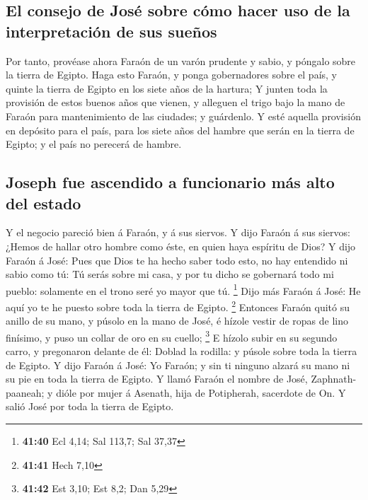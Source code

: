 \hypertarget{el-consejo-de-josuxe9-sobre-cuxf3mo-hacer-uso-de-la-interpretaciuxf3n-de-sus-sueuxf1os}{%
\subsection{El consejo de José sobre cómo hacer uso de la interpretación
de sus
sueños}\label{el-consejo-de-josuxe9-sobre-cuxf3mo-hacer-uso-de-la-interpretaciuxf3n-de-sus-sueuxf1os}}

 Por tanto, provéase ahora Faraón de un varón prudente y
sabio, y póngalo sobre la tierra de Egipto.  Haga esto
Faraón, y ponga gobernadores sobre el país, y quinte la tierra de Egipto
en los siete años de la hartura;  Y junten toda la
provisión de estos buenos años que vienen, y alleguen el trigo bajo la
mano de Faraón para mantenimiento de las ciudades; y guárdenlo.
 Y esté aquella provisión en depósito para el país, para
los siete años del hambre que serán en la tierra de Egipto; y el país no
perecerá de hambre.

\hypertarget{joseph-fue-ascendido-a-funcionario-muxe1s-alto-del-estado}{%
\subsection{Joseph fue ascendido a funcionario más alto del
estado}\label{joseph-fue-ascendido-a-funcionario-muxe1s-alto-del-estado}}

 Y el negocio pareció bien á Faraón, y á sus siervos.
 Y dijo Faraón á sus siervos: ¿Hemos de hallar otro
hombre como éste, en quien haya espíritu de Dios?  Y dijo
Faraón á José: Pues que Dios te ha hecho saber todo esto, no hay
entendido ni sabio como tú:  Tú serás sobre mi casa, y
por tu dicho se gobernará todo mi pueblo: solamente en el trono seré yo
mayor que tú. \footnote{\textbf{41:40} Ecl 4,14; Sal 113,7; Sal 37,37}
 Dijo más Faraón á José: He aquí yo te he puesto sobre
toda la tierra de Egipto. \footnote{\textbf{41:41} Hech 7,10}
 Entonces Faraón quitó su anillo de su mano, y púsolo en
la mano de José, é hízole vestir de ropas de lino finísimo, y puso un
collar de oro en su cuello; \footnote{\textbf{41:42} Est 3,10; Est 8,2;
  Dan 5,29}  E hízolo subir en su segundo carro, y
pregonaron delante de él: Doblad la rodilla: y púsole sobre toda la
tierra de Egipto.  Y dijo Faraón á José: Yo Faraón; y sin
ti ninguno alzará su mano ni su pie en toda la tierra de Egipto.
 Y llamó Faraón el nombre de José, Zaphnath-paaneah; y
dióle por mujer á Asenath, hija de Potipherah, sacerdote de On. Y salió
José por toda la tierra de Egipto.


